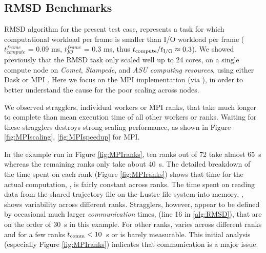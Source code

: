 \label{impl_exp}

\subsection{RMSD Benchmarks}
\label{sec:RMSD}
RMSD algorithm for the present test case, represents a task for which computational workload per frame is smaller than I/O workload per frame ($t_{compute}^{frame}$ = 0.09 ms, $t_{IO}^{frame}$ = 0.3 ms, thus ${t}_{\text{compute}}/{t}_{\text{I/O}} \approx 0.3$). 
We showed previously that the RMSD task only scaled well up to 24 cores, on a single compute node on \emph{Comet}, \emph{Stampede}, and \emph{ASU computing resources}, using either Dask or MPI \cite{Khoshlessan:2017ab}. 
Here we focus on the MPI implementation (via  \cite{Dalcin:2011aa, Dalcin:2005aa}), in order to
better understand the cause for the poor scaling across nodes.

We observed stragglers, individual workers or MPI ranks, that take much longer to complete than mean execution time of all other workers or ranks. 
Waiting for these stragglers destroys strong scaling performance, as shown in Figure \ref{fig:MPIscaling}, \ref{fig:MPIspeedup} for MPI. 

In the example run in Figure \ref{fig:MPIranks}, ten ranks out of 72 take almost 65~s whereas the
remaining ranks only take about 40~s. The detailed breakdown of the time spent on each rank (Figure \ref{fig:MPIranks}) shows that time
for the actual computation, \tcomp, is fairly constant across ranks. 
The time spent on reading data from the shared trajectory file on the Lustre file system into memory, \tIO, shows variability across different ranks. 
Stragglers, however, appear to be defined by occasional much larger \emph{communication} times, \tcomm (line 16 in \ref{alg:RMSD}), that are on the order of 30~s in this example. 
For other ranks, \tcomm varies across different ranks and for a few ranks $t_{\text{comm}} < 10$~s or is barely measurable. 
This initial analysis (especially Figure \ref{fig:MPIranks}) indicates that communication is a major issue. 

